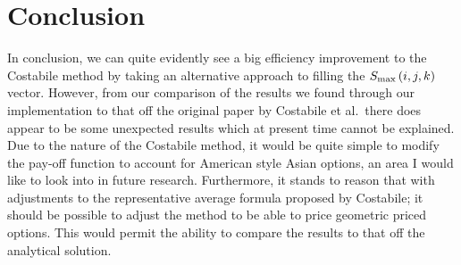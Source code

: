 \chapter{Conclusion}

In conclusion, we can quite evidently see a big efficiency improvement to the Costabile method by taking an alternative approach to filling the \(S_\text{max}\left({i},{j},{k}\right)\) vector. However, from our comparison of the results we found through our implementation to that off the original paper by Costabile et al.~there does appear to be some unexpected results which at present time cannot be explained. Due to the nature of the Costabile method, it would be quite simple to modify the pay-off function to account for American style Asian options, an area I would like to look into in future research. Furthermore, it stands to reason that with adjustments to the representative average formula proposed by Costabile; it should be possible to adjust the method to be able to price geometric priced options. This would permit the ability to compare the results to that off the analytical solution.